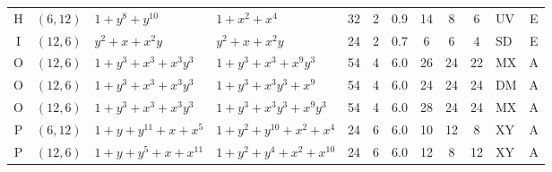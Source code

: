 \begin{table}[t]
\begin{tabular*}{\textwidth}{@{\extracolsep{\fill}}clllcccccclc}
H & $(6,12)$ & $1{+}y^{8}{+}y^{10}$ & $1{+}x^{2}{+}x^{4}$ & 32 & 2 & 0.9 & 14 & 8 & 6 & UV & E \\
I & $(12,6)$ & $y^{2}{+}x{+}x^{2}y$ & $y^{2}{+}x{+}x^{2}y$ & 24 & 2 & 0.7 & 6 & 6 & 4 & SD & E \\
\midrule
O & $(12,6)$ & $1{+}y^{3}{+}x^{3}{+}x^{3}y^{3}$ & $1{+}y^{3}{+}x^{3}{+}x^{9}y^{3}$ & 54 & 4 & 6.0 & 26 & 24 & 22 & MX & A \\
O & $(12,6)$ & $1{+}y^{3}{+}x^{3}{+}x^{3}y^{3}$ & $1{+}y^{3}{+}x^{3}y^{3}{+}x^{9}$ & 54 & 4 & 6.0 & 24 & 24 & 24 & DM & A \\
O & $(12,6)$ & $1{+}y^{3}{+}x^{3}{+}x^{3}y^{3}$ & $1{+}y^{3}{+}x^{3}y^{3}{+}x^{9}y^{3}$ & 54 & 4 & 6.0 & 28 & 24 & 24 & MX & A \\
P & $(6,12)$ & $1{+}y{+}y^{11}{+}x{+}x^{5}$ & $1{+}y^{2}{+}y^{10}{+}x^{2}{+}x^{4}$ & 24 & 6 & 6.0 & 10 & 12 & 8 & XY & A \\
P & $(12,6)$ & $1{+}y{+}y^{5}{+}x{+}x^{11}$ & $1{+}y^{2}{+}y^{4}{+}x^{2}{+}x^{10}$ & 24 & 6 & 6.0 & 12 & 8 & 12 & XY & A \\
\bottomrule
\end{tabular*}
\end{table}

